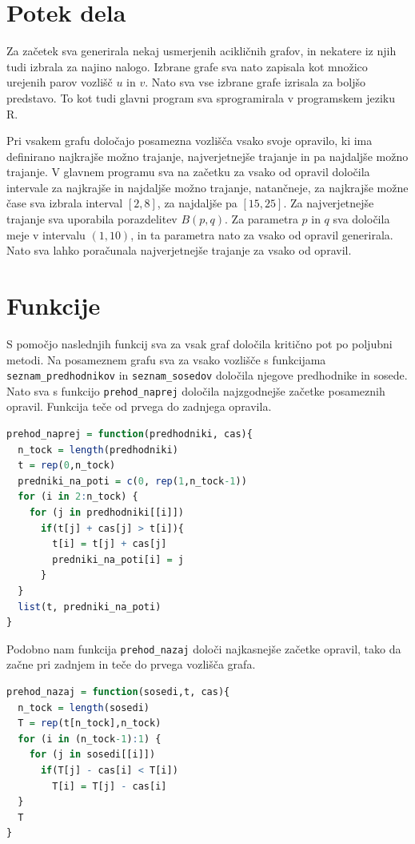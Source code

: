 \documentclass[12pt, a4paper]{article}
\begin{document}
\newpage{}

\section{Potek dela}

Za začetek sva generirala nekaj usmerjenih acikličnih grafov, in nekatere iz njih tudi izbrala za najino nalogo. Izbrane grafe sva nato zapisala kot množico urejenih parov vozlišč $u$ in $v$. Nato sva vse izbrane grafe izrisala za boljšo predstavo. To kot tudi glavni program sva sprogramirala v programskem jeziku R.

Pri vsakem grafu določajo posamezna vozlišča vsako svoje opravilo, ki ima definirano najkrajše možno trajanje, najverjetnejše trajanje in pa najdaljše možno trajanje. V glavnem programu sva na začetku za vsako od opravil določila intervale za najkrajše in najdaljše možno trajanje, natančneje, za najkrajše možne čase sva izbrala interval $[2,8]$, za najdaljše pa $[15,25]$. Za najverjetnejše trajanje sva uporabila porazdelitev $B(p,q)$. Za parametra $p$ in $q$ sva določila meje v intervalu $(1,10)$, in ta parametra nato za vsako od opravil generirala. Nato sva lahko poračunala najverjetnejše trajanje za vsako od opravil.

\section{Funkcije}
S pomočjo naslednjih funkcij sva za vsak graf določila kritično pot po poljubni metodi. Na posameznem 
grafu sva za vsako vozlišče s funkcijama \texttt{seznam\_predhodnikov} in \texttt{seznam\_sosedov} 
določila njegove predhodnike in sosede. \\
Nato sva s funkcijo \texttt{prehod\_naprej} določila najzgodnejše začetke posameznih opravil. Funkcija teče od prvega do zadnjega opravila.
\begin{lstlisting}[language=R]
prehod_naprej = function(predhodniki, cas){
  n_tock = length(predhodniki)
  t = rep(0,n_tock)
  predniki_na_poti = c(0, rep(1,n_tock-1))
  for (i in 2:n_tock) {
    for (j in predhodniki[[i]])
      if(t[j] + cas[j] > t[i]){
        t[i] = t[j] + cas[j]
        predniki_na_poti[i] = j
      }
  }
  list(t, predniki_na_poti)
}
\end{lstlisting}

Podobno nam funkcija \texttt{prehod\_nazaj} določi najkasnejše začetke opravil, tako da začne pri zadnjem in teče do prvega vozlišča grafa.
\begin{lstlisting}[language=R]
prehod_nazaj = function(sosedi,t, cas){
  n_tock = length(sosedi)
  T = rep(t[n_tock],n_tock)
  for (i in (n_tock-1):1) {
    for (j in sosedi[[i]])
      if(T[j] - cas[i] < T[i])
        T[i] = T[j] - cas[i]
  }
  T
}   
\end{lstlisting}
\end{document}
